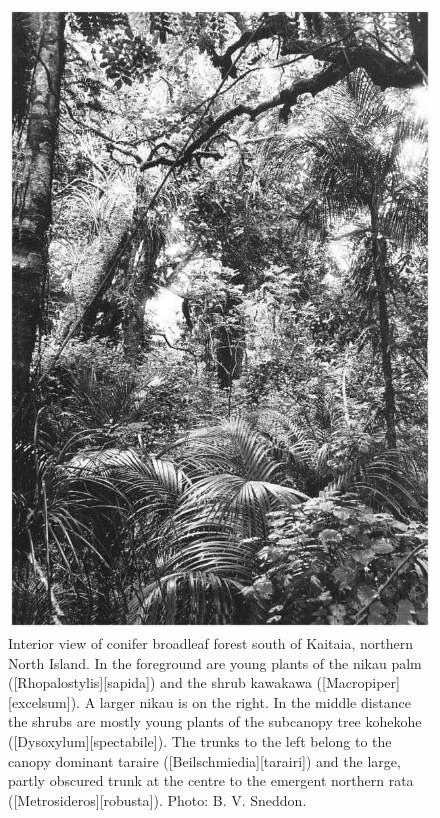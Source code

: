 \begin{figure}[!htb]
\begin{minipage}[t]{0.446\textwidth}
    	\includegraphics[width=\textwidth]{graphics/figure8conifer.jpg}
    	\caption[Interior view of conifer broadleaf forest south of Kaitaia]{Interior view of conifer broadleaf forest south of Kaitaia, northern North Island.
    	In the foreground are young plants of the nikau palm ([Rhopalostylis][sapida]) and the shrub kawakawa ([Macropiper][excelsum]).
    	A larger nikau is on the right.
    	In the middle distance the shrubs are mostly young plants of the subcanopy tree kohekohe ([Dysoxylum][spectabile]).
    	The trunks to the left belong to the canopy dominant taraire ([Beilschmiedia][tarairi]) and the large, partly obscured trunk at the centre to the emergent northern rata ([Metrosideros][robusta]).
    	Photo: B. V. Sneddon.}%
    	\label{fig:8conifer}
	\end{minipage}
\end{figure}

